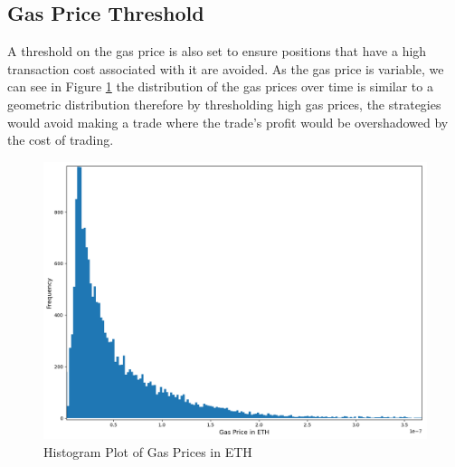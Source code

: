 \subsection{Gas Price Threshold}
A threshold on the gas price is also set to ensure positions that have a high transaction cost associated with it are avoided. As the gas price is variable, we can see in Figure \ref{fig:GasPriceHistogram} the distribution of the gas prices over time is similar to a geometric distribution therefore by thresholding high gas prices, the strategies would avoid making a trade where the trade's profit would be overshadowed by the cost of trading.
\begin{figure}[h!]
    \centering
    \includegraphics[width=\linewidth]{evaluation/Images/GasPriceHistogram.png}
    \caption{Histogram Plot of Gas Prices in ETH}
    \label{fig:GasPriceHistogram}
\end{figure}

